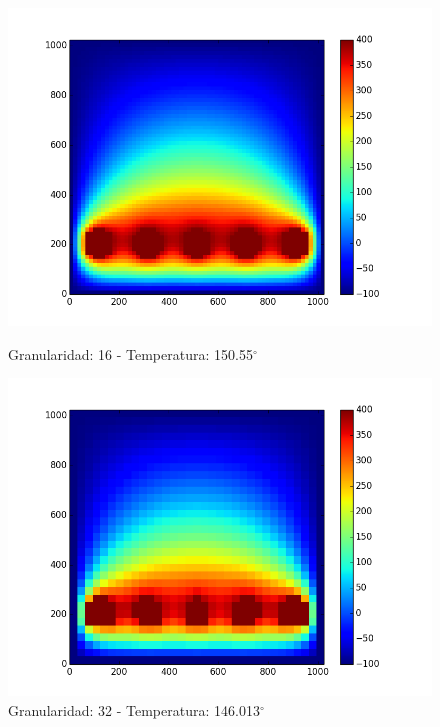 \begin{figure}[htb]
\begin{center}
\includegraphics[scale=0.3]{imagenes/caso3_16.png} 
\caption{Granularidad: 16 - Temperatura: 150.55$^{\circ}$} 
        \end{center}
\endminipage\hfill
{}
\begin{center}
\includegraphics[scale=0.3]{imagenes/caso3_32.png} 
\caption{Granularidad: 32 - Temperatura: 146.013$^{\circ}$} 
        \end{center}
\endminipage\hfill 
\end{figure}

